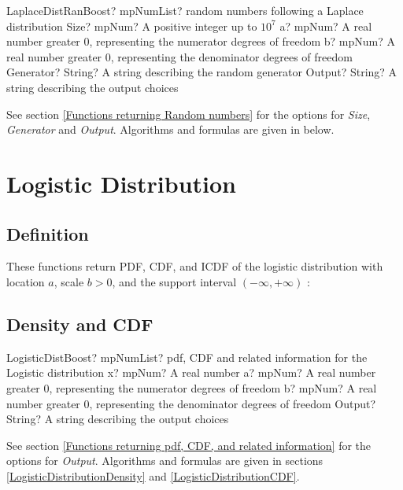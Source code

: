 \begin{mpFunctionsExtract}
	\mpFunctionFiveNotImplemented
	{LaplaceDistRanBoost? mpNumList? random numbers following a Laplace distribution}
	{Size? mpNum? A positive integer up to $10^7$}
	{a? mpNum? A real number greater 0, representing the numerator  degrees of freedom}
	{b? mpNum? A real number greater 0, representing the denominator degrees of freedom}
	{Generator? String? A string describing the random generator}
	{Output? String? A string describing the output choices}
\end{mpFunctionsExtract}

\vspace{0.3cm}

See section \ref{Functions returning Random numbers} for the options for  {\itshape\sffamily Size},  {\itshape\sffamily Generator} and {\itshape\sffamily Output}. Algorithms and formulas are given in below.





\newpage
\section{Logistic Distribution}

\subsection{Definition}
These functions return PDF, CDF, and ICDF of the logistic distribution with location
$a$, scale $b > 0$, and the support interval $(-\infty,+\infty)$ :

\subsection{Density and CDF}
\begin{mpFunctionsExtract}
	\mpFunctionFourNotImplemented
	{LogisticDistBoost? mpNumList? pdf, CDF and related information for the Logistic distribution}
	{x? mpNum? A real number}
	{a? mpNum? A real number greater 0, representing the numerator  degrees of freedom}
	{b? mpNum? A real number greater 0, representing the denominator degrees of freedom}
	{Output? String? A string describing the output choices}
\end{mpFunctionsExtract}

\vspace{0.3cm}
See section \ref{Functions returning pdf, CDF, and related information} for the options for {\itshape\sffamily Output}. Algorithms and formulas are given in sections \ref{LogisticDistributionDensity} and \ref{LogisticDistributionCDF}.


